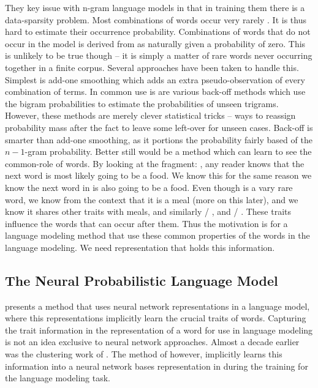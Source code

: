 \documentclass[parskip]{komatufte}
\begin{document}
They key issue with n-gram language models in that in training them there is a data-sparsity problem.
Most combinations of words occur very rarely .
It is thus hard to estimate their occurrence probability.
Combinations of words that do not occur in the model is derived from as naturally given a probability of zero.
This is unlikely to be true though -- it is simply a matter of rare words never occurring together in a finite corpus.
Several approaches have been taken to handle this.
Simplest is add-one smoothing which adds an extra pseudo-observation of every combination of terms.
In common use is are various back-off methods  which use the bigram probabilities to estimate the probabilities of unseen trigrams.
%
%
However, these methods are merely clever statistical tricks -- ways to reassign probability mass after the fact to leave some left-over for unseen cases.
Back-off is smarter than add-one smoothing, as it portions the probability fairly based of the $n{-}1$-gram probability.
Better still would be a method which can learn to see the common-role of words.
By looking at the fragment: , any reader knows that the next word is most likely going to be a food.
We know this for the same reason we know the next word in  is also going to be a food.
Even though  is a vary rare word, we know from the context that it is a meal (more on this later), and we know it shares other traits with meals, and similarly  / , and  / .
These traits influence the words that can occur after them.
Thus the motivation is for a language modeling method that use these common properties of the words in the language modeling.
We need representation that holds this information.

\subsection{The Neural Probabilistic Language Model}

 presents a method that uses neural network representations in a language model, where this representations implicitly learn the crucial traits of words.
Capturing the trait information in the representation of a word for use in language modeling is not an idea exclusive to neural network approaches.
Almost a decade earlier was the clustering work of  .
The method of  however, implicitly learns this information into a neural network bases representation in during the training for the language modeling task.
\end{document}

